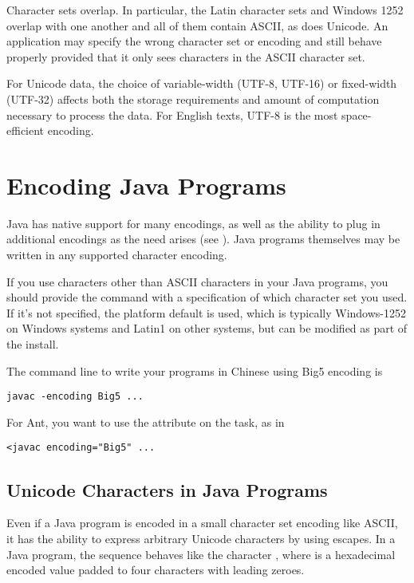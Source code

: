 Character sets overlap.
In particular, the Latin character sets
and Windows 1252 overlap with one another and all of them
contain ASCII, as does Unicode.
An application may specify the wrong character set or encoding
and still behave properly provided that it only sees characters
in the ASCII character set.

For Unicode data, the choice of variable-width (UTF-8, UTF-16)
or fixed-width (UTF-32) affects both the storage requirements
and amount of computation necessary to process the data.
For English texts, UTF-8 is the most space-efficient encoding.

\section{Encoding Java Programs}

Java has native support for many encodings, as well as the ability to
plug in additional encodings as the need arises (see
).  Java programs themselves may be
written in any supported character encoding.

If you use characters other than ASCII characters in your Java
programs, you should provide the  command with a
specification of which character set you used.  If it's not specified,
the platform default is used, which is typically Windows-1252 on
Windows systems and Latin1 on other systems, but can be modified as
part of the install.  

The command line to write your programs in Chinese using Big5 encoding
is
%
\begin{verbatim}
javac -encoding Big5 ...
\end{verbatim}
%
For Ant, you want to use the  attribute on the
 task, as in
%
\begin{verbatim}
<javac encoding="Big5" ...
\end{verbatim}


\subsection{Unicode Characters in Java Programs}\label{section:char-unicode-java}

Even if a Java program is encoded in a small character set encoding
like ASCII, it has the ability to express arbitrary Unicode characters
by using escapes.  In a Java program, the sequence
  behaves like the character
, where  is a hexadecimal
encoded value padded to four characters with leading zeroes.

